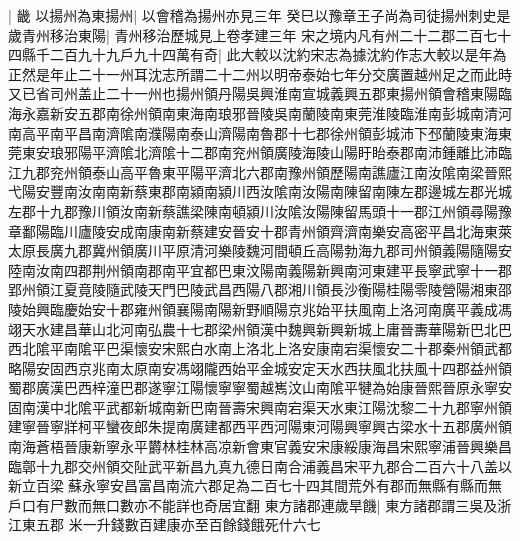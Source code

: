 |{
	畿}
以揚州為東揚州|{
	以會稽為揚州亦見三年}
癸巳以豫章王子尚為司徒揚州刺史是歲青州移治東陽|{
	青州移治歷城見上卷孝建三年}
宋之境内凡有州二十二郡二百七十四縣千二百九十九戶九十四萬有奇|{
	此大較以沈約宋志為據沈約作志大較以是年為正然是年止二十一州耳沈志所謂二十二州以明帝泰始七年分交廣置越州足之而此時又已省司州盖止二十一州也揚州領丹陽吳興淮南宣城義興五郡東揚州領會稽東陽臨海永嘉新安五郡南徐州領南東海南琅邪晉陵吳南蘭陵南東莞淮陵臨淮南彭城南清河南高平南平昌南濟隂南濮陽南泰山濟陽南魯郡十七郡徐州領彭城沛下邳蘭陵東海東莞東安琅邪陽平濟隂北濟隂十二郡南兖州領廣陵海陵山陽盱眙泰郡南沛鍾離比沛臨江九郡兖州領泰山高平魯東平陽平濟北六郡南豫州領歷陽南譙廬江南汝隂南梁晉熙弋陽安豐南汝南南新蔡東郡南潁南潁川西汝隂南汝陽南陳留南陳左郡邊城左郡光城左郡十九郡豫川領汝南新蔡譙梁陳南頓潁川汝隂汝陽陳留馬頭十一郡江州領尋陽豫章鄱陽臨川廬陵安成南康南新蔡建安晉安十郡青州領齊濟南樂安高密平昌北海東萊太原長廣九郡冀州領廣川平原清河樂陵魏河間頓丘高陽勃海九郡司州領義陽隨陽安陸南汝南四郡荆州領南郡南平宜都巴東汶陽南義陽新興南河東建平長寧武寧十一郡郢州領江夏竟陵隨武陵天門巴陵武昌西陽八郡湘川領長沙衡陽桂陽零陵營陽湘東邵陵始興臨慶始安十郡雍州領襄陽南陽新野順陽京兆始平扶風南上洛河南廣平義成馮翊天水建昌華山北河南弘農十七郡梁州領漢中魏興新興新城上庸晉夀華陽新巴北巴西北隂平南隂平巴渠懷安宋熙白水南上洛北上洛安康南宕渠懷安二十郡秦州領武都略陽安固西京兆南太原南安馮翊隴西始平金城安定天水西扶風北扶風十四郡益州領蜀郡廣漢巴西梓潼巴郡遂寧江陽懷寧寧蜀越嶲汶山南隂平犍為始康晉熙晉原永寧安固南漢中北隂平武都新城南新巴南晉壽宋興南宕渠天水東江陽沈黎二十九郡寧州領建寧晉寧牂柯平蠻夜郎朱提南廣建都西平西河陽東河陽興寧興古梁水十五郡廣州領南海蒼梧晉康新寧永平欝林桂林高凉新會東官義安宋康綏康海昌宋熙寧浦晉興樂昌臨鄣十九郡交州領交阯武平新昌九真九德日南合浦義昌宋平九郡合二百六十八盖以新立百梁蘇永寧安昌富昌南流六郡足為二百七十四其間荒外有郡而無縣有縣而無戶口有尸數而無口數亦不能詳也奇居宜翻}
東方諸郡連歲旱饑|{
	東方諸郡謂三吳及浙江東五郡}
米一升錢數百建康亦至百餘錢餓死什六七

